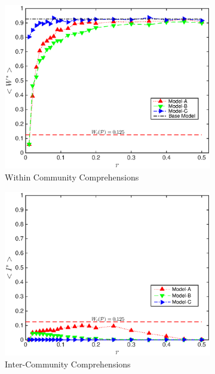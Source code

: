 \documentclass[pre,twocolumn,showkeys,longbibliography]{revtex4-1}
\theoremstyle{plain}%
\theoremstyle{definition}
\theoremstyle{remark}
\begin{document}
\begin{figure}[!tbp]
	\begin{subfigure}{\columnwidth}%
		\includegraphics[width=\columnwidth]
			{Fig-WStar.eps}
		\caption{Within Community Comprehensions} 
		\label{fig:FigWStar}
	\end{subfigure}
	\begin{subfigure}{\columnwidth}%
		\includegraphics[width=\columnwidth]
			{Fig-IStar.eps}
		\caption{Inter-Community Comprehensions} 
		\label{fig:FigIStar}
	\end{subfigure}
	\begin{subfigure}{\columnwidth}%

\end{subfigure}
\end{figure}
\end{document}
